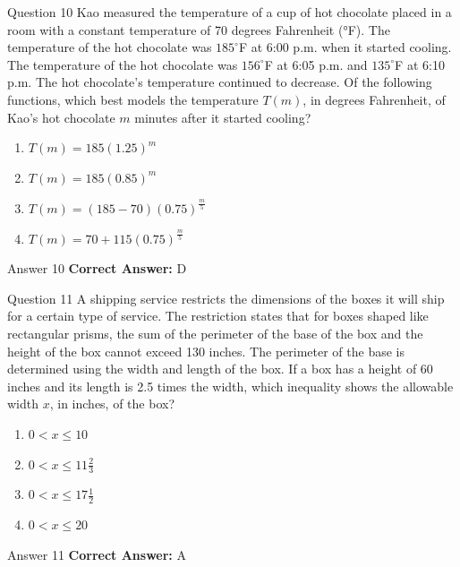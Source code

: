 \documentclass{beamer}
\begin{document}
\begin{frame}{Question 10}
\small
Kao measured the temperature of a cup of hot chocolate placed in a room with a constant temperature of 70 degrees Fahrenheit (°F). The temperature of the hot chocolate was \(\displaystyle 185^\circ\)F at 6:00 p.m. when it started cooling. The temperature of the hot chocolate was \(\displaystyle 156^\circ\)F at 6:05 p.m. and \(\displaystyle 135^\circ\)F at 6:10 p.m. The hot chocolate’s temperature continued to decrease. Of the following functions, which best models the temperature \(\displaystyle T(m)\), in degrees Fahrenheit, of Kao’s hot chocolate \(\displaystyle m\) minutes after it started cooling?
\vspace{0.35cm}
\begin{enumerate}
    \item[A.] \(\displaystyle T(m) = 185(1.25)^m\)
    \item[B.] \(\displaystyle T(m) = 185(0.85)^m\)
    \item[C.] \(\displaystyle T(m) = (185 - 70)(0.75)^{\frac{m}{5}}\)
    \item[D.] \(\displaystyle T(m) = 70 + 115(0.75)^{\frac{m}{5}}\)
\end{enumerate}

\end{frame}
\begin{frame}{Answer 10}
\small
\textbf{Correct Answer:} D
\end{frame}

\begin{frame}{Question 11}
\small
A shipping service restricts the dimensions of the boxes it will ship for a certain type of service. The restriction states that for boxes shaped like rectangular prisms, the sum of the perimeter of the base of the box and the height of the box cannot exceed 130 inches. The perimeter of the base is determined using the width and length of the box. If a box has a height of 60 inches and its length is 2.5 times the width, which inequality shows the allowable width \( x \), in inches, of the box?
\vspace{0.35cm}
\begin{enumerate}
    \item[A.] \(\displaystyle 0 \lt x \leq 10\)
    \item[B.] \(\displaystyle 0 \lt x \leq 11\frac{2}{3}\)
    \item[C.] \(\displaystyle 0 \lt x \leq 17\frac{1}{2}\)
    \item[D.] \(\displaystyle 0 \lt x \leq 20\)
\end{enumerate}

\end{frame}
\begin{frame}{Answer 11}
\small
\textbf{Correct Answer:} A
\end{frame}
\end{document}
